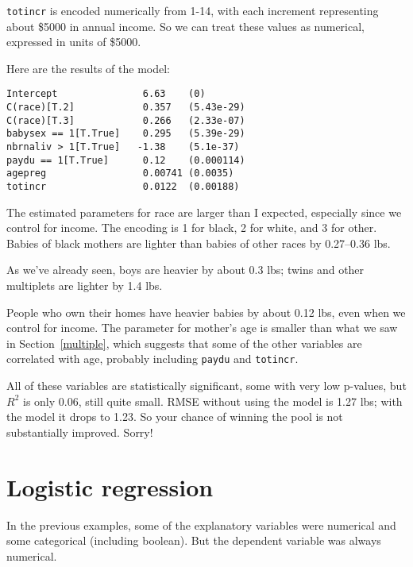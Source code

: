 {\tt totincr} is encoded numerically from 1-14, with each increment
representing about \$5000 in annual income.  So we can treat these
values as numerical, expressed in units of \$5000.

Here are the results of the model:

\begin{verbatim}
Intercept               6.63    (0)
C(race)[T.2]            0.357   (5.43e-29)
C(race)[T.3]            0.266   (2.33e-07)
babysex == 1[T.True]    0.295   (5.39e-29)
nbrnaliv > 1[T.True]   -1.38    (5.1e-37)
paydu == 1[T.True]      0.12    (0.000114)
agepreg                 0.00741 (0.0035)
totincr                 0.0122  (0.00188)
\end{verbatim}

The estimated parameters for race are larger than I expected,
especially since we control for income.  The encoding
is 1 for black, 2 for white, and 3 for other.  Babies of black
mothers are lighter than babies of other races by 0.27--0.36 lbs.

As we've already seen, boys are heavier by about 0.3 lbs;
twins and other multiplets are lighter by 1.4 lbs.

People who own their homes have heavier babies by about 0.12 lbs,
even when we control for income.  The parameter for mother's
age is smaller than what we saw in Section~\ref{multiple}, which
suggests that some of the other variables are correlated with
age, probably including {\tt paydu} and {\tt totincr}.

All of these variables are statistically significant, some with
very low p-values, but 
$R^2$ is only 0.06, still quite small.
RMSE without using the model is 1.27 lbs; with the model it drops
to 1.23.  So your chance of winning the pool is not substantially
improved.  Sorry!
   



\section{Logistic regression}

In the previous examples, some of the explanatory variables were
numerical and some categorical (including boolean).  But the dependent
variable was always numerical.

